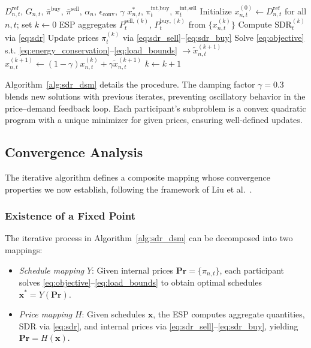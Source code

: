 \documentclass[pdflatex,sn-mathphys-num]{sn-jnl}
\theoremstyle{thmstyleone}
\theoremstyle{thmstyletwo}
\begin{document}
\begin{algorithm}[t]
\caption{Distributed SDR-DSM Settlement}
\label{alg:sdr_dsm}
\begin{algorithmic}[1]
\Require $D_{n,t}^{\text{ref}}$, $G_{n,t}$, $\bar{\pi}^{\text{buy}}$, $\bar{\pi}^{\text{sell}}$, $\alpha_n$, $\epsilon_{\text{conv}}$, $\gamma$
\Ensure $x_{n,t}^{*}$, $\pi_t^{\text{int,buy}}$, $\pi_t^{\text{int,sell}}$
\State Initialize $x_{n,t}^{(0)} \leftarrow D_{n,t}^{\text{ref}}$ for all $n, t$; set $k \leftarrow 0$
\Repeat
    \State ESP aggregates $P_t^{\text{sell},(k)}$, $P_t^{\text{buy},(k)}$ from $\{x_{n,t}^{(k)}\}$
    \State Compute $\text{SDR}_t^{(k)}$ via \eqref{eq:sdr}
    \State Update prices $\pi_t^{(k)}$ via \eqref{eq:sdr_sell}--\eqref{eq:sdr_buy}
        \State Solve \eqref{eq:objective} s.t. \eqref{eq:energy_conservation}--\eqref{eq:load_bounds} $\to \tilde{x}_{n,t}^{(k+1)}$
        \State $x_{n,t}^{(k+1)} \leftarrow (1-\gamma) x_{n,t}^{(k)} + \gamma \tilde{x}_{n,t}^{(k+1)}$ 
    \EndFor
    \State $k \leftarrow k + 1$
\end{algorithmic}
\end{algorithm}

Algorithm~\ref{alg:sdr_dsm} details the procedure. The damping factor $\gamma = 0.3$ blends new solutions with previous iterates, preventing oscillatory behavior in the price--demand feedback loop. Each participant's subproblem is a convex quadratic program with a unique minimizer for given prices, ensuring well-defined updates.

\subsection{Convergence Analysis}

The iterative algorithm defines a composite mapping whose convergence properties we now establish, following the framework of Liu et al.~\cite{liu2017}.

\subsubsection{Existence of a Fixed Point}

The iterative process in Algorithm~\ref{alg:sdr_dsm} can be decomposed into two mappings:
\begin{itemize}
    \item \textit{Schedule mapping} $Y$: Given internal prices $\mathbf{Pr} = \{\pi_{n,t}\}$, each participant solves \eqref{eq:objective}--\eqref{eq:load_bounds} to obtain optimal schedules $\mathbf{x}^* = Y(\mathbf{Pr})$.
    \item \textit{Price mapping} $H$: Given schedules $\mathbf{x}$, the ESP computes aggregate quantities, SDR via \eqref{eq:sdr}, and internal prices via \eqref{eq:sdr_sell}--\eqref{eq:sdr_buy}, yielding $\mathbf{Pr} = H(\mathbf{x})$.
\end{itemize}
\end{document}
